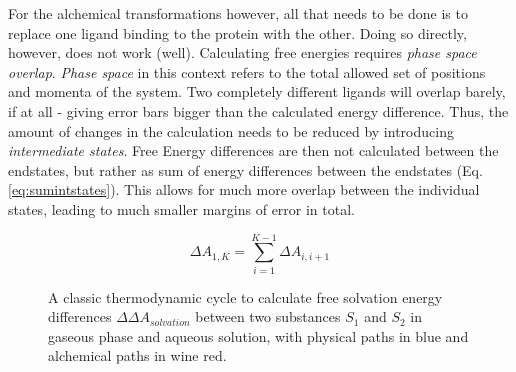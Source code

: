 \documentclass[oneside]{scrreprt}
\begin{document}
For the alchemical transformations however, all that needs to be done is to replace one ligand binding to the protein with the other. Doing so directly, however, does not work (well). Calculating free energies requires \emph{phase space overlap}. \emph{Phase space} in this context refers to the total allowed set of positions and momenta of the system. Two completely different ligands will overlap barely, if at all - giving error bars bigger than the calculated energy difference. Thus, the amount of changes in the calculation needs to be reduced by introducing \emph{intermediate states}. Free Energy differences are then not calculated between the endstates, but rather as sum of energy differences between the endstates (Eq. \ref{eq:sumintstates}). This allows for much more overlap between the individual states, leading to much smaller margins of error in total.

\begin{equation}
    \Delta A_{1,K} = \sum^{K-1}_{i=1} \Delta A_{i,i+1}
    \label{eq:sumintstates}
\end{equation}



\begin{figure}[h]
    \centering
     



    \caption[Thermodynamic cycle for RSFE differences]{A classic thermodynamic cycle to calculate free solvation energy differences $\Delta\Delta A_{solvation}$ between two substances $S_1$ and $S_2$ in gaseous phase and aqueous solution, with physical paths in blue and alchemical paths in wine red.}
    \label{fig:thermocycle_rsfe}
\end{figure}
\end{document}
